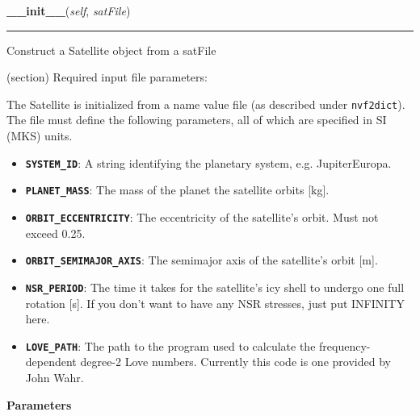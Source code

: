 \hspace{.8\funcindent}\begin{boxedminipage}{\funcwidth}

    \raggedright \textbf{\_\_init\_\_}(\textit{self}, \textit{satFile})

    \vspace{-1.5ex}

    \rule{\textwidth}{0.5\fboxrule}
\setlength{\parskip}{2ex}
    Construct a Satellite object from a satFile

    (section) Required input file parameters:

      The Satellite is initialized from a name value file (as described 
      under \texttt{nvf2dict}).  The file must define the following 
      parameters, all of which are specified in SI (MKS) units.

      \begin{itemize}
      \setlength{\parskip}{0.6ex}
        \item \textbf{\texttt{SYSTEM\_ID}}:  A string identifying the planetary
          system, e.g. JupiterEuropa.

        \item \textbf{\texttt{PLANET\_MASS}}:  The mass of the planet the 
          satellite orbits [kg].

        \item \textbf{\texttt{ORBIT\_ECCENTRICITY}}:  The eccentricity of the 
          satellite's orbit.  Must not exceed 0.25.

        \item \textbf{\texttt{ORBIT\_SEMIMAJOR\_AXIS}}:  The semimajor axis of 
          the satellite's orbit [m].

        \item \textbf{\texttt{NSR\_PERIOD}}:  The time it takes for the 
          satellite's icy shell to undergo one full rotation [s].  If you 
          don't want to have any NSR stresses, just put INFINITY here.

        \item \textbf{\texttt{LOVE\_PATH}}:  The path to the program used to 
          calculate the frequency-dependent degree-2 Love numbers.  
          Currently this code is one provided by John Wahr.

      \end{itemize}

\setlength{\parskip}{1ex}
      \textbf{Parameters}
      \vspace{-1ex}


\end{boxedminipage}

